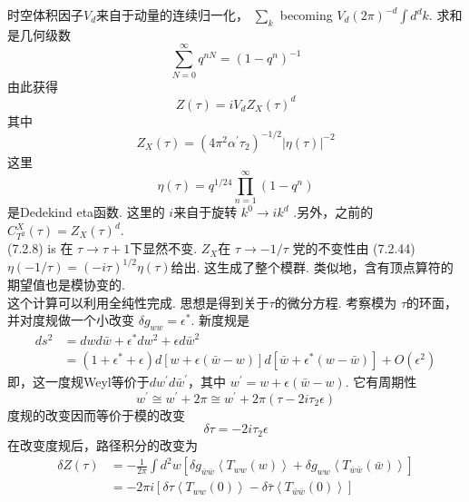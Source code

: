 时空体积因子$V_{d}$来自于动量的连续归一化， $\sum_{k}$ becoming $V_{d}(2 \pi)^{-d} \int d^{d} k$. 求和是几何级数
\begin{equation}
	\sum_{N=0}^{\infty} q^{n N}=\left(1-q^{n}\right)^{-1}
\end{equation}
由此获得
\begin{equation}
	Z(\tau)=i V_{d} Z_{X}(\tau)^{d}
\end{equation}
其中
\begin{equation}
	Z_{X}(\tau)=\left(4 \pi^{2} \alpha^{\prime} \tau_{2}\right)^{-1 / 2}|\eta(\tau)|^{-2}
\end{equation}
这里
\begin{equation}
	\eta(\tau)=q^{1 / 24} \prod_{n=1}^{\infty}\left(1-q^{n}\right)
\end{equation}
是Dedekind eta函数. 这里的 $i$来自于旋转 $k^{0} \rightarrow i k^{d}$ .另外，之前的 $C_{T^{2}}^{X}(\tau)=Z_{X}(\tau)^{d}$.\\
 (7.2.8) is 在 $\tau \rightarrow \tau+1$下显然不变.  $Z_{X}$在 $\tau \rightarrow-1 / \tau$ 党的不变性由 (7.2.44)$\eta(-1 / \tau)=(-i \tau)^{1 / 2} \eta(\tau)$给出. 这生成了整个模群. 类似地，含有顶点算符的期望值也是模协变的. \\
这个计算可以利用全纯性完成. 思想是得到关于$\tau$的微分方程. 考察模为 $\tau$的环面，并对度规做一个小改变 $\delta g_{w w}=\epsilon^{*}$. 新度规是
\begin{equation}
	\begin{aligned}
		d s^{2} &=d w d \bar{w}+\epsilon^{*} d w^{2}+\epsilon d \bar{w}^{2} \\
		&=\left(1+\epsilon^{*}+\epsilon\right) d[w+\epsilon(\bar{w}-w)] d\left[\bar{w}+\epsilon^{*}(w-\bar{w})\right]+O\left(\epsilon^{2}\right)
	\end{aligned}
\end{equation}
即，这一度规Weyl等价于$d w^{\prime} d \bar{w}^{\prime}$，其中 $w^{\prime}=w+\epsilon(\bar{w}-w)$. 它有周期性
\begin{equation}
	w^{\prime} \cong w^{\prime}+2 \pi \cong w^{\prime}+2 \pi\left(\tau-2 i \tau_{2} \epsilon\right)
\end{equation}
度规的改变因而等价于模的改变
\begin{equation}
	\delta \tau=-2 i \tau_{2} \epsilon
\end{equation}
在改变度规后，路径积分的改变为
\begin{equation}
	\begin{aligned}
		\delta Z(\tau) &=-\frac{1}{2 \pi} \int d^{2} w\left[\delta g_{\bar{w} \bar{w}}\left\langle T_{w w}(w)\right\rangle+\delta g_{w w}\left\langle T_{\bar{w} \bar{w}}(\bar{w})\right\rangle\right] \\
		&=-2 \pi i\left[\delta \tau\left\langle T_{w w}(0)\right\rangle-\delta \bar{\tau}\left\langle T_{\bar{w} \bar{w}}(0)\right\rangle\right]
	\end{aligned}
\end{equation}

